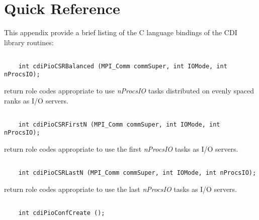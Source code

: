 \chapter*{Quick Reference}

This appendix provide a brief listing of the C language bindings of the
CDI library routines:

\section*{\tt {}}

\begin{verbatim}
    int cdiPioCSRBalanced (MPI_Comm commSuper, int IOMode, int nProcsIO);
\end{verbatim}

return role codes appropriate to use \textit{nProcsIO}
tasks distributed on evenly spaced ranks as I/O servers.


\section*{\tt {}}

\begin{verbatim}
    int cdiPioCSRFirstN (MPI_Comm commSuper, int IOMode, int nProcsIO);
\end{verbatim}

return role codes appropriate to use the first
\textit{nProcsIO} tasks as I/O servers.


\section*{\tt {}}

\begin{verbatim}
    int cdiPioCSRLastN (MPI_Comm commSuper, int IOMode, int nProcsIO);
\end{verbatim}

return role codes appropriate to use the last
\textit{nProcsIO} tasks as I/O servers.


\section*{\tt {}}

\begin{verbatim}
    int cdiPioConfCreate ();
\end{verbatim}

